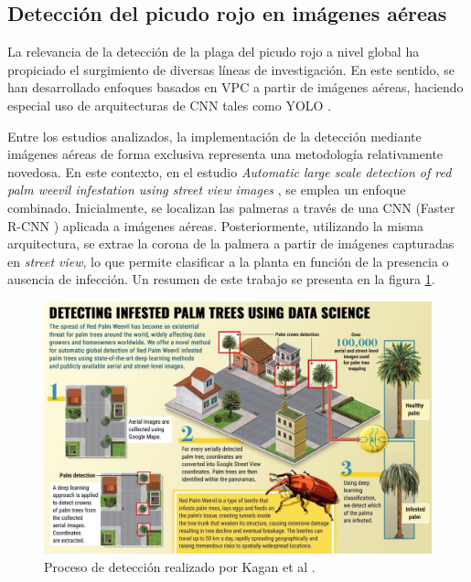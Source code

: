 \subsection{Detección del picudo rojo en imágenes aéreas}

La relevancia de la detección de la plaga del picudo rojo a nivel global ha propiciado el surgimiento de diversas líneas de investigación. En este sentido, se han desarrollado enfoques basados en VPC a partir de imágenes aéreas, haciendo especial uso de arquitecturas de CNN tales como YOLO \citep{redmon_you_2016}.

Entre los estudios analizados, la implementación de la detección mediante imágenes aéreas de forma exclusiva representa una metodología relativamente novedosa. En este contexto, en el estudio \textit{Automatic large scale detection of red palm weevil infestation using street view images} \citep{kagan_automatic_2021}, se emplea un enfoque combinado. Inicialmente, se localizan las palmeras a través de una CNN (Faster R-CNN \citep{ren_faster_2016}) aplicada a imágenes aéreas. Posteriormente, utilizando la misma arquitectura, se extrae la corona de la palmera a partir de imágenes capturadas en \textit{street view}, lo que permite clasificar a la planta en función de la presencia o ausencia de infección. Un resumen de este trabajo se presenta en la figura \ref{fig:kagan-automatic-2021-process}.

\begin{figure}[htpb]
  \centering
  \includegraphics[scale=1.8]{./Figures/kagan_automatic_2021-process.jpg}
  \caption{Proceso de detección realizado por Kagan et al \protect\footnotemark.}
  \label{fig:kagan-automatic-2021-process}
\end{figure}

